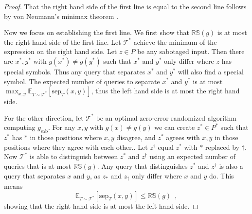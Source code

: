 \documentclass[11pt]{article}
\numberwithin{equation}{section}
\theoremstyle{definition}
\theoremstyle{plain}
\newcommand{\clT}{\mathcal{T}}
\newcommand{\RS}{\mathbb{RS}}
\newcommand{\sep}{\mathrm{sep}}
\newcommand{\sab}{\mathrm{sab}}
\newcommand{\E}{\mathbb{E}}
\begin{document}
\begin{proof}
That the right hand side of the first line is equal to the second line follows by von Neumann's minimax theorem \cite{vonNeumann}.

Now we focus on establishing the first line.  We first show that $\RS(g)$ is at most the right hand side of the first line.
Let $\clT^*$ achieve the minimum of the expression on the right hand side.  Let $z \in P$ be any sabotaged input.  Then there 
are $x^*,y^*$ with $g(x^*) \ne g(y^*)$ such that $x^*$ and $y^*$ only differ where $z$ has special symbols.  Thus any 
query that separates $x^*$ and $y^*$ will also find a special symbol.  The expected number of queries to separate 
$x^*$ and $y^*$ is at most $\max_{x,y} \E_{T \sim \clT^*} [\sep_T(x,y)]$, thus the left hand side is at most the right hand side.

For the other direction, let $\clT^*$ be an optimal zero-error randomized algorithm computing $g_{\sab}$.  For any $x,y$ with 
$g(x) \ne g(y)$ we can create $z^\ast \in P^{\ast}$ such that $z^\ast$ has $\ast$ in those positions where $x,y$ disagree, and 
$z^\ast$ agrees with $x,y$ in those positions where they agree with each other..  Let $z^\dag$ equal $z^\ast$
with $\ast$ replaced by $\dag$.  Now $\clT^*$ is able to distinguish between $z^\ast$ and $z^\dagger$ using an expected number 
of queries that is at most $\RS(g)$.  Any query that distinguishes $z^\ast$ and $z^\dagger$ is also a query that separates $x$ and $y$, 
as $z_\ast$ and $z_\dagger$ only differ where $x$ and $y$ do.  This means
\[
\E_{T \sim \clT^*} [\sep_T(x,y)] \le \RS(g) \enspace ,
\]
showing that the right hand side is at most the left hand side.
\end{proof}
\end{document}
